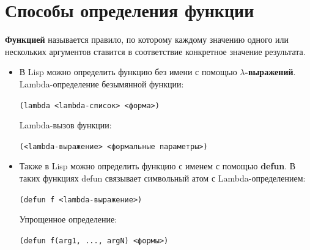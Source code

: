 \documentclass[a4paper,14pt, unknownkeysallowed]{extreport}
\begin{document}
\section{Способы определения функции}

\textbf{Функцией} называется правило, по которому каждому значению одного или нескольких аргументов ставится в соответствие конкретное значение результата.

\begin{itemize}
	\item В Lisp можно определить функцию без имени с помощью \textbf{$\lambda$-выражений}. 
	Lambda-определение безымянной функции:
	
	\begin{center}
	\texttt{(lambda <lambda-список> <форма>)}
	\end{center}

	Lambda-вызов функции:

	\begin{center}
	\texttt{(<lambda-выражение> <формальные параметры>)}
	\end{center}

	\item Также в Lisp можно определить функцию с именем с помощью \textbf{defun}. В таких функциях defun связывает символьный атом с Lambda-определением:
	
	\begin{center}
	\texttt{(defun f <lambda-выражение>)}
	\end{center}

	Упрощенное определение:

	\begin{center}
	\texttt{(defun f(arg1, ..., argN) <формы>)}
	\end{center}

\end{itemize}
\end{document}
